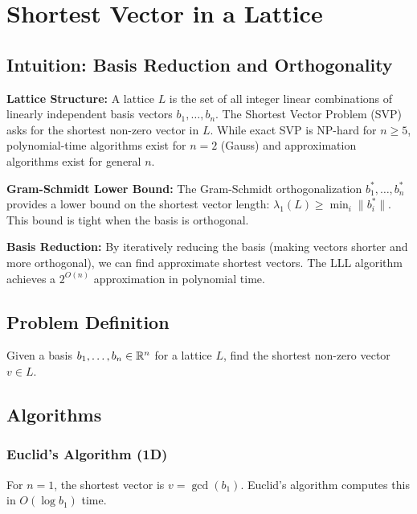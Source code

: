 \setcounter{chapter}{26}
\chapter{Shortest Vector in a Lattice}
\label{ch:shortest_vector}

\section{Intuition: Basis Reduction and Orthogonality}

\begin{intuitionbox}
\textbf{Lattice Structure:} A lattice $L$ is the set of all integer linear combinations of linearly independent basis vectors $b_1, \dots, b_n$. The Shortest Vector Problem (SVP) asks for the shortest non-zero vector in $L$. While exact SVP is NP-hard for $n \ge 5$, polynomial-time algorithms exist for $n = 2$ (Gauss) and approximation algorithms exist for general $n$.

\textbf{Gram-Schmidt Lower Bound:} The Gram-Schmidt orthogonalization $b_1^*, \dots, b_n^*$ provides a lower bound on the shortest vector length: $\lambda_1(L) \ge \min_i \|b_i^*\|$. This bound is tight when the basis is orthogonal.

\textbf{Basis Reduction:} By iteratively reducing the basis (making vectors shorter and more orthogonal), we can find approximate shortest vectors. The LLL algorithm achieves a $2^{O(n)}$ approximation in polynomial time.
\end{intuitionbox}

\section{Problem Definition}
Given a basis $b_1, \dots, b_n \in \mathbb{R}^n$ for a lattice $L$, find the shortest non-zero vector $v \in L$.

\section{Algorithms}

\subsection{Euclid's Algorithm (1D)}
For $n = 1$, the shortest vector is $v = \gcd(b_1)$. Euclid's algorithm computes this in $O(\log b_1)$ time.

